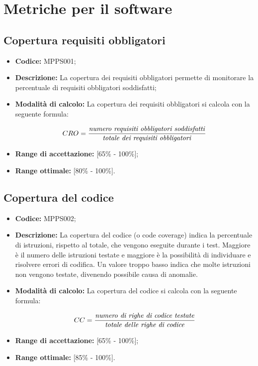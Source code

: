 \documentclass[openany,12pt,a4paper]{report}
\begin{document}

\section{Metriche per il software}

\subsection{Copertura requisiti obbligatori}

\begin{itemize}
    \item \textbf{Codice:} MPPS001;
    \item \textbf{Descrizione:} La copertura dei requisiti obbligatori permette di monitorare la percentuale di requisiti obbligatori soddisfatti;
    \item \textbf{Modalità di calcolo:} La copertura dei requisiti obbligatori si calcola con la seguente formula:
    
    \[ CRO = \frac{\textrm{\textit{numero requisiti obbligatori soddisfatti}}}{\textrm{\textit{totale dei requisiti obbligatori}}} \]
    
    \item \textbf{Range di accettazione:} [65\% - 100\%];
    \item \textbf{Range ottimale:} [80\% - 100\%].
\end{itemize}

\subsection{Copertura del codice}

\begin{itemize}

    \item \textbf{Codice:} MPPS002;

    \item \textbf{Descrizione:} La copertura del codice (o code coverage) indica la percentuale di istruzioni,  rispetto al totale, che vengono eseguite durante i test. Maggiore è il numero delle istruzioni testate e maggiore è la possibilità di individuare e risolvere errori di codifica. Un valore troppo basso indica che molte istruzioni non vengono testate, divenendo possibile causa di anomalie.
    
    \item \textbf{Modalità di calcolo:} La copertura del codice si calcola con la seguente formula:
    
    \[ CC = \frac{\textrm{\textit{numero di righe di codice testate}}}{\textrm{\textit{totale delle righe di codice}}} \]
    
    \item \textbf{Range di accettazione:} [65\% - 100\%];
    \item \textbf{Range ottimale:} [85\% - 100\%].
\end{itemize}
\end{document}
